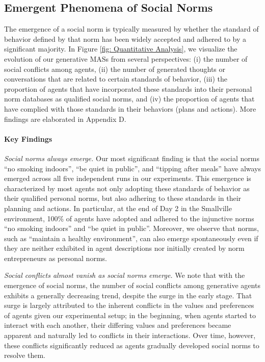 \documentclass{article}
\begin{document}
\subsection{Emergent Phenomena of Social Norms}
\label{subsec: emergent phenomena}
The emergence of a social norm is typically measured by whether the standard of behavior defined by that norm has been widely accepted and adhered to by a significant majority. In Figure \ref{fig: Quantitative Analysis}, we visualize the evolution of our generative MASs from several perspectives: (i) the number of social conflicts among agents, (ii) the number of generated thoughts or conversations that are related to certain standards of behavior,  (iii) the proportion of agents that have incorporated these standards into their personal norm databases as qualified social norms,  and  (iv) the proportion of agents that have complied with those standards in their behaviors (plans and actions). More findings are elaborated in Appendix D.

\paragraph{Key Findings}
\textit{Social norms always emerge. }
Our most significant finding is that the social norms ``no smoking indoors'', ``be quiet in public'', and ``tipping after meals'' have always emerged across all five independent runs in our experiments. This emergence is characterized by most agents not only adopting these standards of behavior as their qualified personal norms, but also adhering to these standards in their planning and actions.
In particular, at the end of Day 2 in the Smallville environment, 100\% of agents have adopted and adhered to the injunctive norms  ``no smoking indoors'' and ``be quiet in public''. Moreover, we observe that norms, such as ``maintain a healthy environment'', can also emerge spontaneously even if they are neither exhibited in agent descriptions nor initially created by norm entrepreneurs as personal norms. 


\textit{Social conflicts almost vanish as social norms emerge.} 
We note that with the emergence of social norms, the number of social conflicts among generative agents exhibits a generally decreasing trend, despite the surge in the early stage.
That surge is largely attributed to the inherent conflicts in the values and preferences of agents given our experimental setup; in the beginning, when agents started to interact with each another, their differing values and preferences became apparent and naturally led to conflicts in their interactions. Over time, however, these conflicts significantly reduced as agents gradually developed social norms to resolve them.
\end{document}
